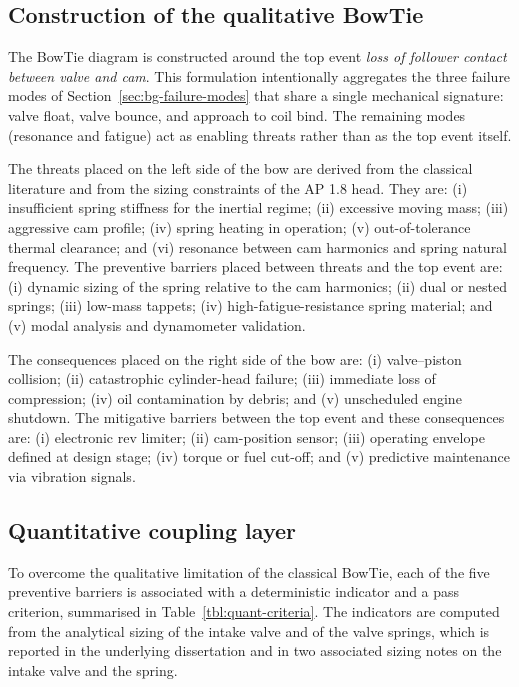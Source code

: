 \subsection{Construction of the qualitative BowTie}
\label{sec:method-bowtie-qual}

The BowTie diagram is constructed around the top event \emph{loss of
follower contact between valve and cam}. This formulation
intentionally aggregates the three failure modes of
Section~\ref{sec:bg-failure-modes} that share a single mechanical
signature: valve float, valve bounce, and approach to coil bind. The
remaining modes (resonance and fatigue) act as enabling threats rather
than as the top event itself.

The threats placed on the left side of the bow are derived from the
classical literature \citep{heywood1988,taylor1985,heisler2002} and
from the sizing constraints of the AP 1.8 head. They are: (i)
insufficient spring stiffness for the inertial regime; (ii) excessive
moving mass; (iii) aggressive cam profile; (iv) spring heating in
operation; (v) out-of-tolerance thermal clearance; and (vi) resonance
between cam harmonics and spring natural frequency. The preventive
barriers placed between threats and the top event are: (i) dynamic
sizing of the spring relative to the cam harmonics; (ii) dual or
nested springs; (iii) low-mass tappets; (iv) high-fatigue-resistance
spring material; and (v) modal analysis and dynamometer validation.

The consequences placed on the right side of the bow are: (i)
valve--piston collision; (ii) catastrophic cylinder-head failure; (iii)
immediate loss of compression; (iv) oil contamination by debris; and (v)
unscheduled engine shutdown. The mitigative barriers between the top
event and these consequences are: (i) electronic rev limiter; (ii)
cam-position sensor; (iii) operating envelope defined at design stage;
(iv) torque or fuel cut-off; and (v) predictive maintenance via
vibration signals.

\subsection{Quantitative coupling layer}
\label{sec:method-bowtie-quant}

To overcome the qualitative limitation of the classical BowTie, each of
the five preventive barriers is associated with a deterministic
indicator and a pass criterion, summarised in
Table~\ref{tbl:quant-criteria}. The indicators are computed from the
analytical sizing of the intake valve and of the valve springs,
which is reported in the underlying dissertation
\citep{porto2026dissertation} and in two associated sizing notes
on the intake valve and the spring.

